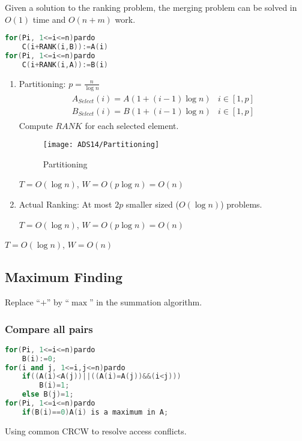 \begin{claim}
    Given a solution to the ranking problem, the merging problem can be solved in $O(1)$ time and $O(n+m)$ work.
\end{claim}
\begin{lstlisting}[language={c++}]
for(Pi, 1<=i<=n)pardo
    C(i+RANK(i,B)):=A(i)
for(Pi, 1<=i<=n)pardo
    C(i+RANK(i,A)):=B(i)
\end{lstlisting}

\begin{enumerate}
    \item Partitioning: $p=\frac{n}{\log n}$
    \begin{align*}
        \begin{array}{ll}
            A_{Select}( i ) = A( 1+(i-1)\log n )&i \in [1, p]\\
            B_{Select}( i ) = B( 1+(i-1)\log n )&i \in [1, p]
        \end{array}
    \end{align*}
    Compute $RANK$ for each selected element. 

    \begin{figure}[!htb]
        \centering
        \texttt{[image: ADS14/Partitioning]}
        \caption{Partitioning}
    \end{figure}
    $T=O(\log n)$, $W=O(p\log n)=O(n)$
    \item Actual Ranking: At most $2p$ smaller sized ($O(\log n)$) problems.

    $T=O(\log n)$, $W=O(p\log n)=O(n)$
\end{enumerate}
$T=O(\log n)$, $W=O(n)$

\subsection{Maximum Finding}
Replace ``$+$'' by ``$\max$'' in the summation algorithm. 

\subsubsection{Compare all pairs}
\begin{lstlisting}[language={c++}]
for(Pi, 1<=i<=n)pardo
    B(i):=0;
for(i and j, 1<=i,j<=n)pardo
    if((A(i)<A(j))||((A(i)=A(j))&&(i<j)))
        B(i)=1;
    else B(j)=1;
for(Pi, 1<=i<=n)pardo
    if(B(i)==0)A(i) is a maximum in A;
\end{lstlisting}
Using common CRCW to resolve access conflicts. 

